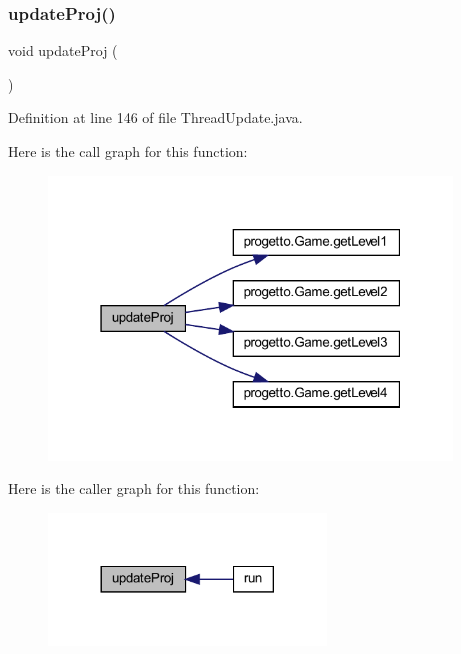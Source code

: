 \subsubsection{\texorpdfstring{update\+Proj()}{updateProj()}}
{\footnotesize\ttfamily void update\+Proj (\begin{DoxyParamCaption}{ }\end{DoxyParamCaption})\hspace{0.3cm}{\ttfamily [private]}}



Definition at line 146 of file Thread\+Update.\+java.

Here is the call graph for this function\+:\nopagebreak
\begin{figure}[H]
\begin{center}
\leavevmode
\includegraphics[width=304pt]{classprogetto_1_1_thread_update_ac83c203b559f6fd0bb225744d7ccf854_cgraph}
\end{center}
\end{figure}
Here is the caller graph for this function\+:\nopagebreak
\begin{figure}[H]
\begin{center}
\leavevmode
\includegraphics[width=209pt]{classprogetto_1_1_thread_update_ac83c203b559f6fd0bb225744d7ccf854_icgraph}
\end{center}
\end{figure}
\mbox{\label{classprogetto_1_1_thread_update_ae4fd4a959e4d782a5e7ac0eff77ba27f}} 
